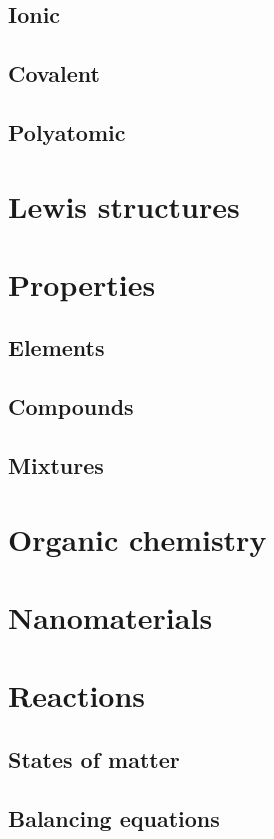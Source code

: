 \documentclass{book}
\begin{document}
\section{Ionic}

\section{Covalent}

\section{Polyatomic}

\chapter{Lewis structures}

\chapter{Properties}
\section{Elements}

\section{Compounds}

\section{Mixtures}

\chapter{Organic chemistry}

\chapter{Nanomaterials}

\chapter{Reactions}
\section{States of matter}

\section{Balancing equations}
\end{document}
